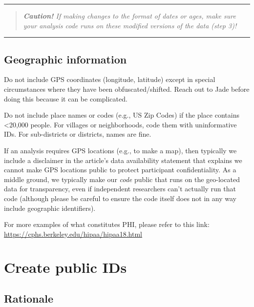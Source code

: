\documentclass[
]{book}
\begin{document}
\begin{center}\rule{0.5\linewidth}{0.5pt}\end{center}

\begin{quote}
\emph{\textbf{Caution!} If making changes to the format of dates or ages, make sure your analysis code runs on these modified versions of the data (step 3)! }
\end{quote}

\begin{center}\rule{0.5\linewidth}{0.5pt}\end{center}

\subsection{Geographic information}\label{geographic-information}

Do not include GPS coordinates (longitude, latitude) except in special circumstances where they have been obfuscated/shifted. Reach out to Jade before doing this because it can be complicated.

Do not include place names or codes (e.g., US Zip Codes) if the place contains \textless20,000 people. For villages or neighborhoods, code them with uninformative IDs. For sub-districts or districts, names are fine.

If an analysis requires GPS locations (e.g., to make a map), then typically we include a disclaimer in the article's data availability statement that explains we cannot make GPS locations public to protect participant confidentiality. As a middle ground, we typically make our \emph{code} public that runs on the geo-located data for transparency, even if independent researchers can't actually run that code (although please be careful to ensure the code itself does not in any way include geographic identifiers).

For more examples of what constitutes PHI, please refer to this link: \url{https://cphs.berkeley.edu/hipaa/hipaa18.html}

\section{Create public IDs}\label{create-public-ids}

\subsection{Rationale}\label{rationale}
\end{document}
